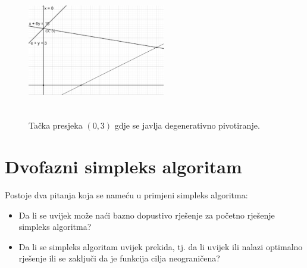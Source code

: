 \documentclass[a4paper, utf8, 11pt, colorlinks]{book}
\begin{document}
\begin{figure}[!ht]
	\centering
	\includegraphics[width=170pt,height=170pt]{deg-sol.eps}
	\caption{Tačka presjeka $(0,3)$ gdje se javlja degenerativno pivotiranje.}
	\label{fig:deg-sol}
\end{figure}

 \section{Dvofazni simpleks algoritam}
 Postoje dva pitanja koja se nameću u primjeni simpleks algoritma:
 \begin{itemize}
     \item Da li se uvijek može naći bazno dopustivo rješenje za početno rješenje 
     simpleks algoritma?
     \item Da li se simpleks algoritam uvijek prekida, tj. da li uvijek ili nalazi optimalno rješenje ili se zaključi da je funkcija cilja neograničena?
 \end{itemize}
 
\end{document}
